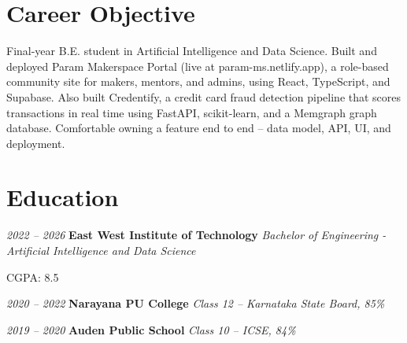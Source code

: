     \section{Career Objective}
        \begin{onecolentry}
            Final-year B.E. student in Artificial Intelligence and Data Science. Built and deployed Param Makerspace Portal (live at param-ms.netlify.app), a role-based community site for makers, mentors, and admins, using React, TypeScript, and Supabase. Also built Credentify, a credit card fraud detection pipeline that scores transactions in real time using FastAPI, scikit-learn, and a Memgraph graph database. Comfortable owning a feature end to end -- data model, API, UI, and deployment.
        \end{onecolentry}
    \section{Education}
        \begin{twocolentry}{
        \textit{2022 – 2026 }}
            \textbf{East West Institute of Technology}
            \textit{Bachelor of Engineering - Artificial Intelligence and Data Science}
        \end{twocolentry}
        \vspace{0.10 cm}
        \begin{onecolentry}
            \begin{highlights}
                \item CGPA: 8.5
            \end{highlights}
        \end{onecolentry}
        \vspace{0.10 cm}
        \begin{twocolentry}{
        \textit{2020 – 2022}}
            \textbf{Narayana PU College}
            \textit{Class 12 -- Karnataka State Board, 85\%}
        \end{twocolentry}
        \vspace{0.10 cm}
        \begin{twocolentry}{
        \textit{2019 – 2020}}
            \textbf{Auden Public School}
            \textit{Class 10 -- ICSE, 84\%}
        \end{twocolentry}

